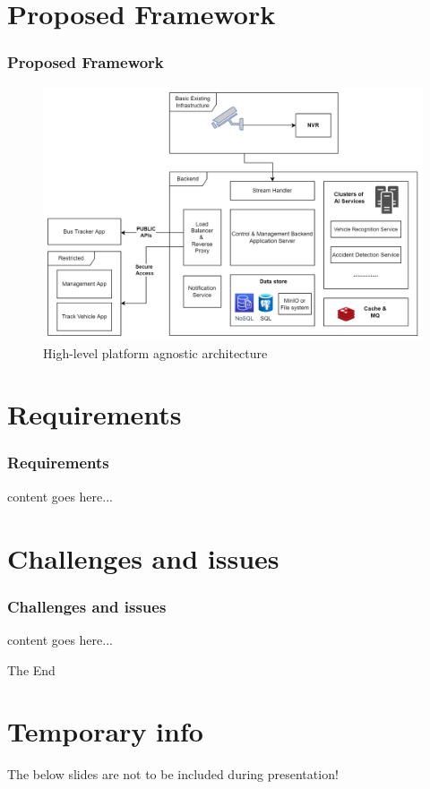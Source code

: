 \documentclass{beamer}
\begin{document}
\section{Proposed Framework}
\begin{frame}
	\frametitle{Proposed Framework}
	\begin{figure}
        \includegraphics[width=0.8\linewidth]{res/architecture.png}
        \caption{High-level platform agnostic architecture}
    \end{figure}
\end{frame}

\section{Requirements}
\begin{frame}
	\frametitle{Requirements}
	content goes here...
\end{frame}


\section{Challenges and issues}
\begin{frame}
	\frametitle{Challenges and issues}
	content goes here...
\end{frame}


\begin{frame}
	\Huge{\centerline{The End}}
\end{frame}

\section{Temporary info}
\begin{frame}
	The below slides are not to be included during presentation! 
\end{frame}
\end{document}
